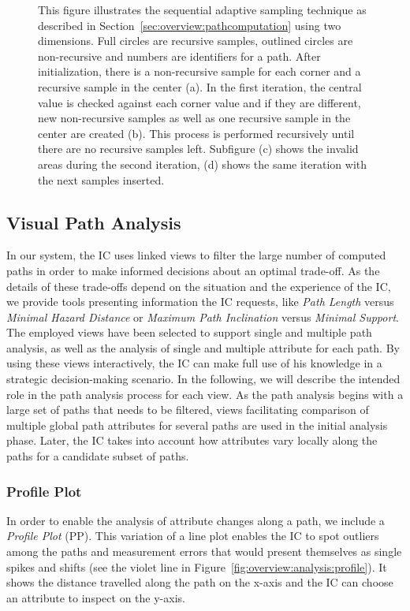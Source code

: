 \documentclass{egpubl}
\begin{document}
\begin{figure}
{		\label{fig:sampling:adaptive:4}
	}
	\hfill
	\caption{This figure illustrates the sequential adaptive sampling technique as described in Section~\ref{sec:overview:pathcomputation} using two dimensions. Full circles are recursive samples, outlined circles are non-recursive and numbers are identifiers for a path. After initialization, there is a non-recursive sample for each corner and a recursive sample in the center (a). In the first iteration, the central value is checked against each corner value and if they are different, new non-recursive samples as well as one recursive sample in the center are created (b). This process is performed recursively until there are no recursive samples left. Subfigure (c) shows the invalid areas during the second iteration, (d) shows the same iteration with the next samples inserted.}
	\label{fig:sampling:adaptive}
\end{figure}

\subsection{Visual Path Analysis} \label{sec:overview:pathanalysis}
In our system, the IC uses linked views to filter the large number of computed paths in order to make informed decisions about an optimal trade-off. As the details of these trade-offs depend on the situation and the experience of the IC, we provide tools presenting information the IC requests, like \emph{Path Length} versus \emph{Minimal Hazard Distance} or \emph{Maximum Path Inclination} versus \emph{Minimal Support}. The employed views have been selected to support single and multiple path analysis, as well as the analysis of single and multiple attribute for each path. By using these views interactively, the IC can make full use of his knowledge in a strategic decision-making scenario. In the following, we will describe the intended role in the path analysis process for each view. As the path analysis begins with a large set of paths that needs to be filtered, views facilitating comparison of multiple global path attributes for several paths are used in the initial analysis phase. Later, the IC takes into account how attributes vary locally along the paths for a candidate subset of paths.

\subsubsection{Profile Plot} \label{sec:overview:analysis:profile}
In order to enable the analysis of attribute changes along a path, we include a \emph{Profile Plot} (PP). This variation of a line plot enables the IC to spot outliers among the paths and measurement errors that would present themselves as single spikes and shifts (see the violet line in Figure~\ref{fig:overview:analysis:profile}). It shows the distance travelled along the path on the x-axis and the IC can choose an attribute to inspect on the y-axis.
\end{document}
